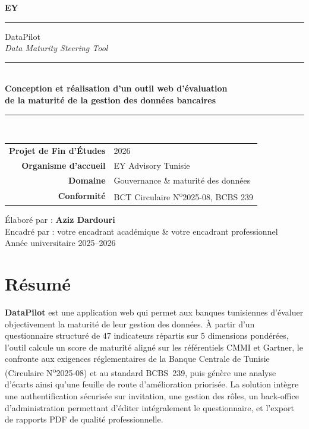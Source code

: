 \documentclass[11pt,a4paper]{report}
\begin{document}
\begin{titlepage}
\centering
\vspace*{1cm}

{\Huge\bfseries\color{eycharcoal} EY \;}\rule{2pt}{1.5em}\; {\Large DataPilot}\\[0.3cm]
{\large\itshape Data Maturity Steering Tool}\\[2cm]

\rule{\linewidth}{0.5mm}\\[0.5cm]
{\LARGE\bfseries Conception et réalisation d'un outil web d'évaluation\\[0.2cm]
de la maturité de la gestion des données bancaires}\\[0.4cm]
\rule{\linewidth}{0.5mm}\\[1.5cm]

{\large
\begin{tabular}{rl}
\textbf{Projet de Fin d'Études} & 2026\\[0.3cm]
\textbf{Organisme d'accueil} & EY Advisory Tunisie\\[0.3cm]
\textbf{Domaine} & Gouvernance \& maturité des données\\[0.3cm]
\textbf{Conformité} & BCT Circulaire N\textsuperscript{o}2025-08, BCBS 239\\
\end{tabular}}

\vfill
{\large Élaboré par : \textbf{Aziz Dardouri}}\\[0.3cm]
{\normalsize Encadré par : votre encadrant académique \& votre encadrant professionnel}\\[1cm]
{\small Année universitaire 2025--2026}

\end{titlepage}

\chapter*{Résumé}

\textbf{DataPilot} est une application web qui permet aux banques tunisiennes
d'évaluer objectivement la maturité de leur gestion des données. À partir d'un
questionnaire structuré de 47 indicateurs répartis sur 5 dimensions pondérées,
l'outil calcule un score de maturité aligné sur les référentiels CMMI et
Gartner, le confronte aux exigences réglementaires de la Banque Centrale de
Tunisie (Circulaire N\textsuperscript{o}2025-08) et au standard BCBS~239, puis
génère une analyse d'écarts ainsi qu'une feuille de route d'amélioration
priorisée. La solution intègre une authentification sécurisée sur invitation,
une gestion des rôles, un back-office d'administration permettant d'éditer
intégralement le questionnaire, et l'export de rapports PDF de qualité
professionnelle.\\
\end{document}
